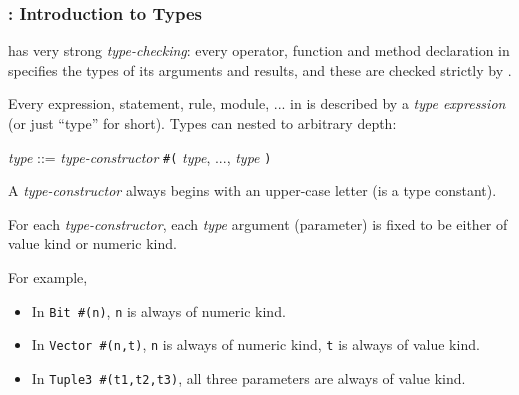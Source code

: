 \begin{frame}[fragile]
\frametitle{{\BSV}: Introduction to Types}

\footnotesize

{\BSV} has very strong \emph{type-checking}: every operator, function
and method declaration in {\BSV} specifies the types of its arguments and
results, and these are checked strictly by {\bsc}.

\PAUSE{\vspace{2ex}}

Every expression, statement, rule, module, ... in {\BSV} is described
by a \emph{type expression} (or just ``type'' for short).  Types can
nested to arbitrary depth:

\begin{tabbing}
 \hmmmm \emph{type} ::= \emph{type-constructor} {\tt \#(} \emph{type}, ..., \emph{type} {\tt )}
\end{tabbing}

\vspace{2ex}

A \emph{type-constructor} always begins with an upper-case letter (is a type constant).

\vspace{2ex}

For each \emph{type-constructor}, each \emph{type} argument
(parameter) is fixed to be either of value kind or numeric kind.

For example,

\begin{itemize}

 \item In \verb|Bit #(n)|, \verb|n| is always of numeric kind.

 \item In \verb|Vector #(n,t)|, \verb|n| is always of numeric kind,
 \verb|t| is always of value kind.

 \item In \verb|Tuple3 #(t1,t2,t3)|, all three parameters are always of value kind.

\end{itemize}

\end{frame}


